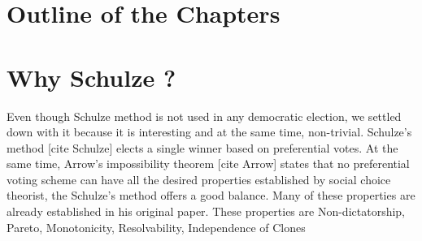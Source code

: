 \section{Outline of the Chapters}
%
%
%
%
%
%



\section{Why Schulze ?}
\label{sec:thesisstatement}
Even though Schulze method is not used in any democratic election, we settled down 
with it because it is interesting  and at the same time, non-trivial. 
 Schulze's method [cite Schulze]  elects  a single winner based on 
preferential votes.  At the same time, Arrow's impossibility theorem [cite Arrow]  states that no preferential voting 
scheme can have all the desired properties established by  social choice theorist,
the Schulze's method offers a good balance. Many of these properties are already 
established in his original paper. These properties are Non-dictatorship,  Pareto,  Monotonicity, 
Resolvability, Independence of Clones 

